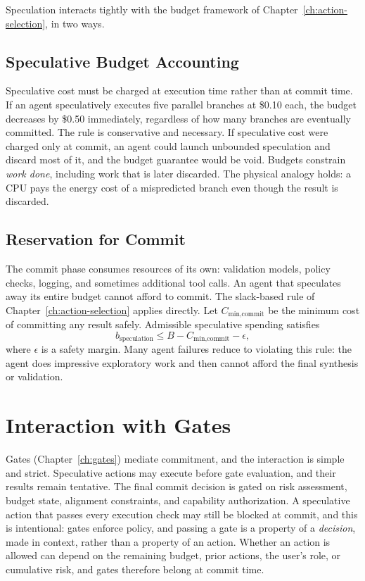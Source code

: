 \documentclass[11pt]{book}
\begin{document}
Speculation interacts tightly with the budget framework of Chapter~\ref{ch:action-selection}, in two ways.

\subsection{Speculative Budget Accounting}

Speculative cost must be charged at execution time rather than at commit time. If an agent speculatively executes five parallel branches at \$0.10 each, the budget decreases by \$0.50 immediately, regardless of how many branches are eventually committed. The rule is conservative and necessary. If speculative cost were charged only at commit, an agent could launch unbounded speculation and discard most of it, and the budget guarantee would be void. Budgets constrain \textit{work done}, including work that is later discarded. The physical analogy holds: a CPU pays the energy cost of a mispredicted branch even though the result is discarded.

\subsection{Reservation for Commit}

The commit phase consumes resources of its own: validation models, policy checks, logging, and sometimes additional tool calls. An agent that speculates away its entire budget cannot afford to commit. The slack-based rule of Chapter~\ref{ch:action-selection} applies directly. Let $C_{\text{min,commit}}$ be the minimum cost of committing any result safely. Admissible speculative spending satisfies
\[
b_{\text{speculation}} \leq B - C_{\text{min,commit}} - \epsilon,
\]
where $\epsilon$ is a safety margin. Many agent failures reduce to violating this rule: the agent does impressive exploratory work and then cannot afford the final synthesis or validation.

\section{Interaction with Gates}

Gates (Chapter~\ref{ch:gates}) mediate commitment, and the interaction is simple and strict. Speculative actions may execute before gate evaluation, and their results remain tentative. The final commit decision is gated on risk assessment, budget state, alignment constraints, and capability authorization. A speculative action that passes every execution check may still be blocked at commit, and this is intentional: gates enforce policy, and passing a gate is a property of a \textit{decision}, made in context, rather than a property of an action. Whether an action is allowed can depend on the remaining budget, prior actions, the user's role, or cumulative risk, and gates therefore belong at commit time.
\end{document}
